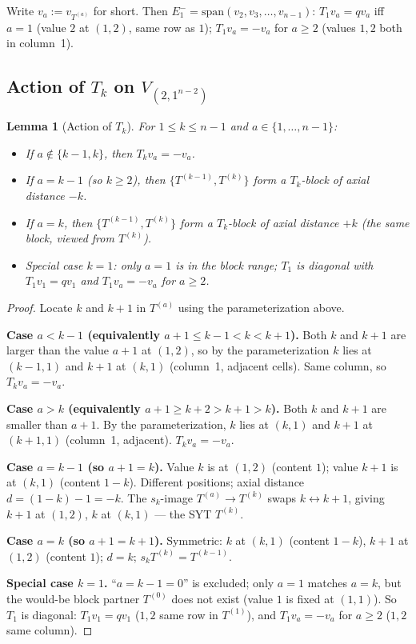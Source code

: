 \documentclass[11pt]{article}
\newtheorem{lemma}[theorem]{Lemma}
\theoremstyle{definition}
\begin{document}
Write $v_a := v_{T^{(a)}}$ for short.  Then $E_1^- =
\mathrm{span}(v_2,v_3,\ldots,v_{n-1})$: $T_1v_a=qv_a$ iff $a=1$
(value $2$ at $(1,2)$, same row as $1$); $T_1v_a=-v_a$ for $a\ge 2$
(values $1,2$ both in column~1).

\subsection{Action of $T_k$ on $V_{(2,1^{n-2})}$}

\begin{lemma}[Action of $T_k$]\label{lem:Tk-on-2-1}
For $1\le k \le n-1$ and $a\in\{1,\ldots,n-1\}$:
\begin{itemize}[leftmargin=2em,topsep=0.3em,itemsep=0.2em]
\item If $a\not\in\{k-1,k\}$, then $T_k v_a = -v_a$.
\item If $a=k-1$ (so $k\ge 2$), then $\{T^{(k-1)},T^{(k)}\}$ form
a $T_k$-block of axial distance $-k$.
\item If $a=k$, then $\{T^{(k-1)},T^{(k)}\}$ form a $T_k$-block of
axial distance $+k$ (the same block, viewed from $T^{(k)}$).
\item Special case $k=1$: only $a=1$ is in the block range; $T_1$ is
diagonal with $T_1 v_1 = qv_1$ and $T_1 v_a = -v_a$ for $a\ge 2$.
\end{itemize}
\end{lemma}

\begin{proof}
Locate $k$ and $k+1$ in $T^{(a)}$ using the parameterization above.

\textbf{Case $a < k-1$ (equivalently $a+1\le k-1<k<k+1$).}  Both
$k$ and $k+1$ are larger than the value $a+1$ at $(1,2)$, so by the
parameterization $k$ lies at $(k-1,1)$ and $k+1$ at $(k,1)$ (column~1,
adjacent cells).  Same column, so $T_k v_a = -v_a$.

\textbf{Case $a > k$ (equivalently $a+1\ge k+2>k+1>k$).}  Both
$k$ and $k+1$ are smaller than $a+1$.  By the parameterization,
$k$ lies at $(k,1)$ and $k+1$ at $(k+1,1)$ (column~1, adjacent).
$T_k v_a = -v_a$.

\textbf{Case $a=k-1$ (so $a+1=k$).}  Value $k$ is at $(1,2)$ (content
$1$); value $k+1$ is at $(k,1)$ (content $1-k$).  Different positions;
axial distance $d=(1-k)-1=-k$.  The $s_k$-image $T^{(a)}\to T^{(k)}$
swaps $k\leftrightarrow k+1$, giving $k+1$ at $(1,2)$, $k$ at $(k,1)$
--- the SYT $T^{(k)}$.

\textbf{Case $a=k$ (so $a+1=k+1$).}  Symmetric: $k$ at $(k,1)$
(content $1-k$), $k+1$ at $(1,2)$ (content $1$); $d=k$; $s_k T^{(k)}=
T^{(k-1)}$.

\textbf{Special case $k=1$.}  ``$a=k-1=0$'' is excluded; only $a=1$
matches $a=k$, but the would-be block partner $T^{(0)}$ does not exist
(value $1$ is fixed at $(1,1)$).  So $T_1$ is diagonal: $T_1v_1=qv_1$
($1,2$ same row in $T^{(1)}$), and $T_1v_a=-v_a$ for $a\ge 2$
($1,2$ same column).
\end{proof}
\end{document}
